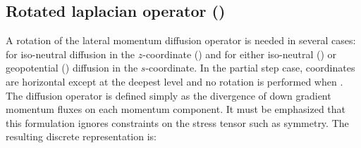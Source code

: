 \documentclass[../main/NEMO_manual]{subfiles}
\begin{document}
\subsection[Rotated laplacian (\protect\np{ln\_dynldf\_iso}\forcode{ = .true.})]
				{Rotated laplacian operator (\protect{})}
\label{subsec:DYN_ldf_iso}

A rotation of the lateral momentum diffusion operator is needed in several cases:
for iso-neutral diffusion in the $z$-coordinate () and
for either iso-neutral () or
geopotential () diffusion in the $s$-coordinate.
In the partial step case, coordinates are horizontal except at the deepest level and
no rotation is performed when .
The diffusion operator is defined simply as the divergence of down gradient momentum fluxes on
each momentum component.
It must be emphasized that this formulation ignores constraints on the stress tensor such as symmetry.
The resulting discrete representation is:
\end{document}
